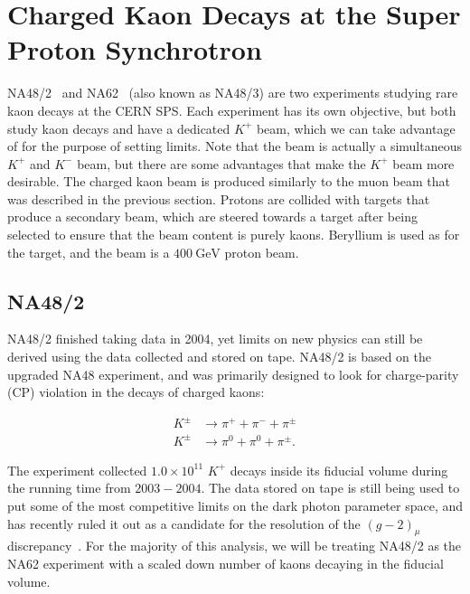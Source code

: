 \section{Charged Kaon Decays at the Super Proton Synchrotron}
\label{sec:na48_na62_experiment}
NA48/2~\cite{Batley:1999fv} and NA62~\cite{Martellotti:2015kna} (also known as NA48/3) are two experiments studying rare kaon decays at the CERN SPS\@.
Each experiment has its own objective, but both study kaon decays and have a dedicated $K^+$ beam, which we can take advantage of for the purpose of setting limits.
Note that the beam is actually a simultaneous $K^+$ and $K^-$ beam, but there are some advantages that make the $K^+$ beam more desirable.
The charged kaon beam is produced similarly to the muon beam that was described in the previous section.
Protons are collided with targets that produce a secondary beam, which are steered towards a target after being selected to ensure that the beam content is purely kaons.
Beryllium is used as for the target, and the beam is a $400~\textrm{GeV}$ proton beam.

\subsection{NA48/2}
NA48/2 finished taking data in 2004, yet limits on new physics can still be derived using the data collected and stored on tape.
NA48/2 is based on the upgraded NA48 experiment, and was primarily designed to look for charge-parity (CP) violation in the decays of charged kaons:

\begin{align}
K^\pm & \rightarrow \pi^+ + \pi^- + \pi^\pm \\
    K^\pm & \rightarrow \pi^0 + \pi^0 + \pi^\pm \textrm{.}
\end{align}

The experiment collected $1.0 \times 10^{11}$ $K^+$ decays inside its fiducial volume during the running time from $2003-2004$.
The data stored on tape is still being used to put some of the most competitive limits on the dark photon parameter space, and has recently ruled it out as a candidate for the resolution of the $(g-2)_\mu$ discrepancy~\cite{Goudzovski:2014rwa}.
For the majority of this analysis, we will be treating NA48/2 as the NA62 experiment with a scaled down number of kaons decaying in the fiducial volume.


